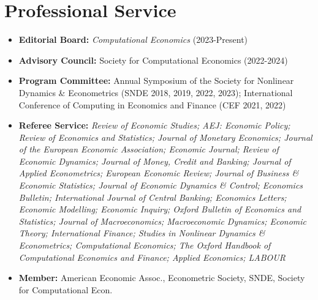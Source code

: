\documentclass[10pt,letterpaper,en-US]{article}
\begin{document}
\section*{Professional Service}
\begin{itemize}
\item \textbf{Editorial Board:} \emph{Computational Economics} (2023-Present)
\item \textbf{Advisory Council:} Society for Computational Economics (2022-2024)
\item \textbf{Program Committee:} Annual Symposium of the Society for Nonlinear Dynamics \& Econometrics (SNDE 2018, 2019, 2022, 2023); International Conference of Computing in Economics and Finance (CEF 2021, 2022)
\item \textbf{Referee Service:} \emph{Review of Economic Studies; AEJ: Economic Policy; Review of Economics and Statistics; Journal of Monetary Economics; Journal of the European Economic Association; Economic Journal; Review of Economic Dynamics; Journal of Money, Credit and Banking; Journal of Applied Econometrics; European Economic Review; Journal of Business \& Economic Statistics; Journal of Economic Dynamics \& Control; Economics Bulletin; International Journal of Central Banking; Economics Letters; Economic Modelling; Economic Inquiry; Oxford Bulletin of Economics and Statistics; Journal of Macroeconomics; Macroeconomic Dynamics; Economic Theory; International Finance; Studies in Nonlinear Dynamics \& Econometrics; Computational Economics; The Oxford Handbook of Computational Economics and Finance; Applied Economics; LABOUR}
\item \textbf{Member:} American Economic Assoc., Econometric Society, SNDE, Society for Computational Econ.
\end{itemize}
\end{document}
